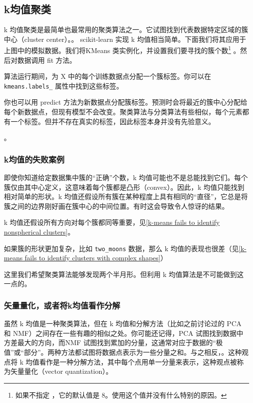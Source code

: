 \subsection{k均值聚类}
k 均值聚类是最简单也最常用的聚类算法之一。它试图找到代表数据特定区域的簇中心（cluster center）。。
scikit-learn 实现 k 均值相当简单。下面我们将其应用于上图中的模拟数据。我们将KMeans 类实例化，并设置我们要寻找的簇个数\footnote{如果不指定 ，它的默认值是 8。使用这个值并没有什么特别的原因。} 。然后对数据调用 fit 方法。

算法运行期间，为 X 中的每个训练数据点分配一个簇标签。你可以在 \verb|kmeans.labels_| 属性中找到这些标签。

你也可以用 predict 方法为新数据点分配簇标签。预测时会将最近的簇中心分配给每个新数据点，但现有模型不会改变。聚类算法与分类算法有些相似，每个元素都有一个标签。但并不存在真实的标签，因此标签本身并没有先验意义。

。

\subsubsection{k均值的失败案例}
即使你知道给定数据集中簇的“正确”个数，k 均值可能也不是总能找到它们。每个簇仅由其中心定义，这意味着每个簇都是凸形（convex）。因此，k 均值只能找到相对简单的形状。k 均值还假设所有簇在某种程度上具有相同的“直径”，它总是将簇之间的边界刚好画在簇中心的中间位置。有时这会导致令人惊讶的结果。

k 均值还假设所有方向对每个簇都同等重要，见\autoref{k-means fails to identify nonspherical clusters}。


如果簇的形状更加复杂，比如 \verb|two_moons| 数据，那么 k 均值的表现也很差（见\autoref{k-means fails to identify clusters with complex shapes}）


这里我们希望聚类算法能够发现两个半月形。但利用 k 均值算法是不可能做到这一点的。
\subsubsection{矢量量化，或者将k均值看作分解}
虽然 k 均值是一种聚类算法，但在 k 均值和分解方法（比如之前讨论过的 PCA 和 NMF）之间存在一些有趣的相似之处。你可能还记得，PCA 试图找到数据中方差最大的方向，而NMF 试图找到累加的分量，这通常对应于数据的“极值”或“部分”。两种方法都试图将数据点表示为一些分量之和。与之相反，。这种观点将 k 均值看作是一种分解方法，其中每个点用单一分量来表示，这种观点被称为矢量量化（vector quantization）。

